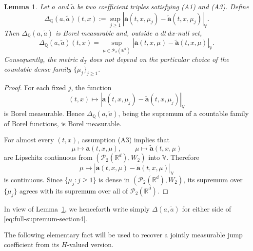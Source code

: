 \documentclass[12pt,oneside, reqno]{amsart}
\newtheorem{lemma}[theorem]{Lemma}
\numberwithin{equation}{section}
\begin{document}
	\begin{lemma}
		\label{lem:measurable-coefficient-supremum}
		Let $a$ and $\widetilde a$ be two coefficient triples satisfying
		\textnormal{(A1)} and \textnormal{(A3)}. Define
		\begin{equation}
			\label{eq:dense-supremum-section4}
			\Delta_{\mathbb Q}(a,\widetilde a)(t,x)
			:=
			\sup_{j\geq1}
			\left|
			\mathbf a(t,x,\mu_j)
			-
			\widetilde{\mathbf a}(t,x,\mu_j)
			\right|_{\mathbb V}.
		\end{equation}
		Then $\Delta_{\mathbb Q}(a,\widetilde a)$ is Borel measurable and,
		outside a $dt\,dx$-null set,
		\begin{equation}
			\label{eq:full-supremum-section4}
			\Delta_{\mathbb Q}(a,\widetilde a)(t,x)
			=
			\sup_{\mu\in\mathcal P_2(\mathbb R^d)}
			\left|
			\mathbf a(t,x,\mu)
			-
			\widetilde{\mathbf a}(t,x,\mu)
			\right|_{\mathbb V}.
		\end{equation}
		Consequently, the metric $d_T$ does not depend on the particular
		choice of the countable dense family
		$\{\mu_j\}_{j\geq1}$.
	\end{lemma}
	
	\begin{proof}
		For each fixed \(j\), the function
		\[
		(t,x)\longmapsto
		\left|
		\mathbf a(t,x,\mu_j)
		-
		\widetilde{\mathbf a}(t,x,\mu_j)
		\right|_{\mathbb V}
		\]
		is Borel measurable. Hence
		\(\Delta_{\mathbb Q}(a,\widetilde a)\), being the supremum of a
		countable family of Borel functions, is Borel measurable.
		
		For almost every \((t,x)\), assumption \textnormal{(A3)} implies
		that
		\[
		\mu\longmapsto\mathbf a(t,x,\mu),
		\qquad
		\mu\longmapsto\widetilde{\mathbf a}(t,x,\mu)
		\]
		are Lipschitz continuous from
		\((\mathcal P_2(\mathbb R^d),W_2)\) into \(\mathbb V\). Therefore
		\[
		\mu\longmapsto
		\left|
		\mathbf a(t,x,\mu)
		-
		\widetilde{\mathbf a}(t,x,\mu)
		\right|_{\mathbb V}
		\]
		is continuous. Since \(\{\mu_j:j\geq1\}\) is dense in
		\((\mathcal P_2(\mathbb R^d),W_2)\), its supremum over
		\(\{\mu_j\}\) agrees with its supremum over all of
		\(\mathcal P_2(\mathbb R^d)\).
	\end{proof}
	
	In view of Lemma~\ref{lem:measurable-coefficient-supremum}, we
	henceforth write simply $ \Delta(a,\widetilde a)$ for either side of \eqref{eq:full-supremum-section4}.
	
	
	The following elementary fact will be used to recover a jointly
	measurable jump coefficient from its $H$-valued version.
	
\end{document}
